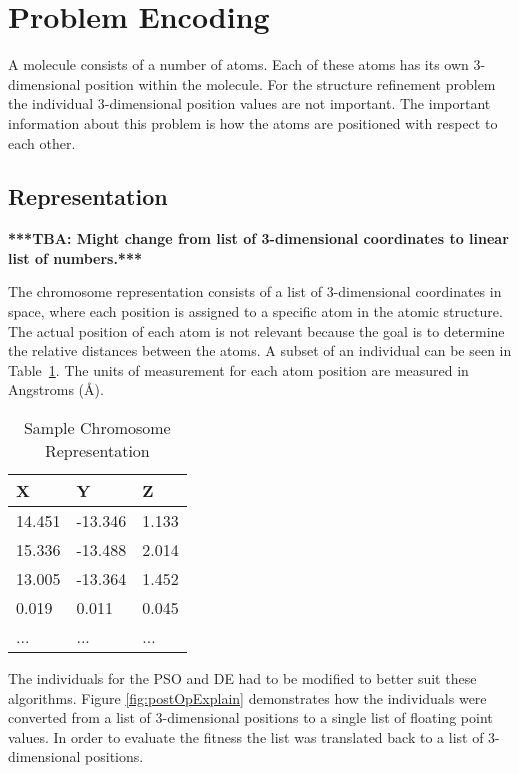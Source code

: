 \section{Problem Encoding}

A molecule consists of a number of atoms. Each of these atoms has its own 3-dimensional position within the molecule. For the structure refinement problem the individual 3-dimensional position values are not important. The important information about this problem is how the atoms are positioned with respect to each other.

\subsection{Representation}

\textbf{***TBA: Might change from list of 3-dimensional coordinates to linear list of numbers.***}

The chromosome representation consists of a list of 3-dimensional coordinates in space, where each position is assigned to a specific atom in the atomic structure. The actual position of each atom is not relevant because the goal is to determine the relative distances between the atoms. A subset of an individual can be seen in Table~\ref{table:sampleChromosome}. The units of measurement for each atom position are measured in Angstroms (\AA).

\begin{table}
\caption{Sample Chromosome Representation}
\label{table:sampleChromosome}
\centering
\normalsize
\begin{tabular}{ | l | l | l |}
  \hline
    X & Y & Z \\ \hline
    14.451 & -13.346 & 1.133 \\ \hline
    15.336 & -13.488 & 2.014 \\ \hline
    13.005 & -13.364 & 1.452 \\ \hline
    0.019 & 0.011 & 0.045 \\ \hline
    ... & ... & ... \\ \hline
\end{tabular}
\end{table}

The individuals for the PSO and DE had to be modified to better suit these algorithms. Figure \ref{fig:postOpExplain} demonstrates how the individuals were converted from a list of 3-dimensional positions to a single list of floating point values. In order to evaluate the fitness the list was translated back to a list of 3-dimensional positions.